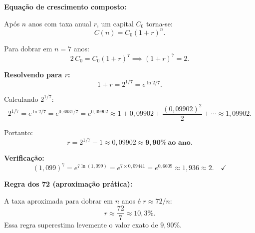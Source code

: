 \textbf{Equação de crescimento composto:}

Após $n$ anos com taxa anual $r$, um capital $C_0$ torna-se:
\[
C(n) = C_0(1+r)^n.
\]

Para dobrar em $n=7$ anos:
\[
2\,C_0 = C_0(1+r)^7 \implies (1+r)^7 = 2.
\]

\textbf{Resolvendo para $r$:}
\[
1+r = 2^{1/7} = e^{\ln 2/7}.
\]

Calculando $2^{1/7}$:
\[
2^{1/7} = e^{\ln 2/7} = e^{0{,}6931/7} = e^{0{,}09902} \approx 1 + 0{,}09902 + \frac{(0{,}09902)^2}{2} + \cdots \approx 1{,}09902.
\]

Portanto:
\[
r = 2^{1/7}-1 \approx 0{,}09902 \approx \mathbf{9{,}90\%\ \text{ao ano}}.
\]

\textbf{Verificação:}
\[
(1{,}099)^7 = e^{7\ln(1{,}099)} = e^{7\times0{,}09441} = e^{0{,}6609}\approx1{,}936\approx2.\quad\checkmark
\]

\textbf{Regra dos 72 (aproximação prática):}

A taxa aproximada para dobrar em $n$ anos é $r\approx72/n$:
\[
r\approx\frac{72}{7}\approx10{,}3\%.
\]
Essa regra superestima levemente o valor exato de $9{,}90\%$.